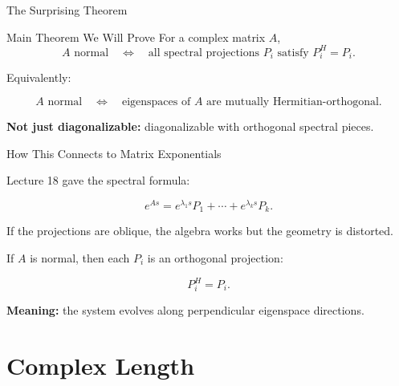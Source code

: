 \documentclass[10pt]{beamer}
\theoremstyle{definition}
\newcommand{\x}[1]{\alert{\textbf{#1}}}
\begin{document}
\begin{frame}{The Surprising Theorem}

\begin{block}{Main Theorem We Will Prove}
For a complex matrix $A$,
$$
A\text{ normal}
\quad\Longleftrightarrow\quad
\text{all spectral projections }P_i\text{ satisfy }P_i^H=P_i.
$$
\end{block}

\vfill\pause

Equivalently:

$$
A\text{ normal}
\quad\Longleftrightarrow\quad
\text{eigenspaces of }A\text{ are mutually Hermitian-orthogonal.}
$$

\vfill\pause

\x{Not just diagonalizable:} diagonalizable with orthogonal spectral pieces.

\end{frame}


\begin{frame}{How This Connects to Matrix Exponentials}

Lecture 18 gave the spectral formula:

$$
e^{As}=e^{\lambda_1s}P_1+\cdots+e^{\lambda_ks}P_k.
$$

\vfill\pause

If the projections are oblique, the algebra works but the geometry is distorted.

\vfill

If $A$ is normal, then each $P_i$ is an orthogonal projection:

$$
P_i^H=P_i.
$$

\vfill

\x{Meaning:} the system evolves along perpendicular eigenspace directions.

\end{frame}

\section{Complex Length}
\end{document}
